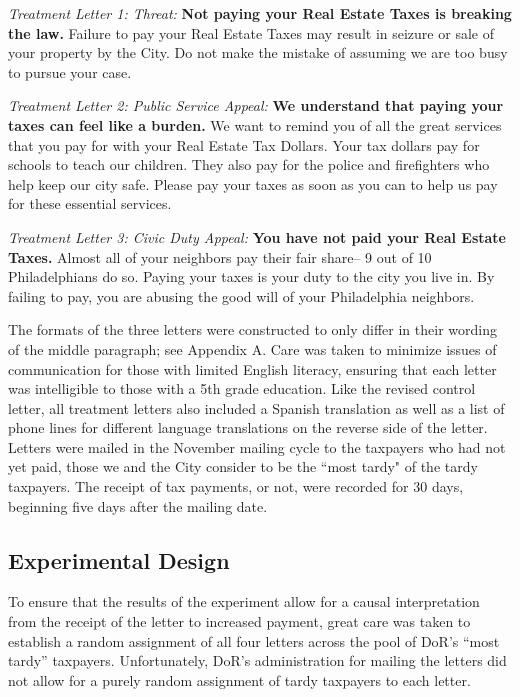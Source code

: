 \documentclass[12pt,titlepage]{article}
\begin{document}
{\it Treatment Letter 1: Threat: } {\bf Not paying your Real Estate
  Taxes is breaking the law.} Failure to pay your Real Estate Taxes
may result in seizure or sale of your property by the City. Do not
make the mistake of assuming we are too busy to pursue your case.

{\it Treatment Letter 2: Public Service Appeal: } {\bf We understand that
  paying your taxes can feel like a burden.} We want to remind you of
all the great services that you pay for with your Real Estate Tax
Dollars. Your tax dollars pay for schools to teach our children.  They
also pay for the police and firefighters who help keep our city safe.
Please pay your taxes as soon as you can to help us pay for these
essential services.
  
{ \it Treatment Letter 3: Civic Duty Appeal: } {\bf You have not paid your
  Real Estate Taxes.}  Almost all of your neighbors pay their fair
share-- 9 out of 10 Philadelphians do so. Paying your taxes is your
duty to the city you live in. By failing to pay, you are abusing the
good will of your Philadelphia neighbors.

The formats of the three letters were constructed to only differ in
their wording of the middle paragraph; see Appendix A.  Care was taken
to minimize issues of communication for those with limited English
literacy, ensuring that each letter was intelligible to those with a
5th grade education.  Like the revised control letter, all treatment
letters also included a Spanish translation as well as a list of phone
lines for different language translations on the reverse side of the
letter.  Letters were mailed in the November mailing cycle to the
taxpayers who had not yet paid, those we and the City consider to be
the ``most tardy" of the tardy taxpayers.  The receipt of tax payments,
or not, were recorded for 30 days, beginning five days after the
mailing date.


\subsection{Experimental Design}

To ensure that the results of the experiment allow for a causal
interpretation from the receipt of the letter to increased payment,
great care was taken to establish a random assignment of all four
letters across the pool of DoR's ``most tardy'' taxpayers.
Unfortunately, DoR's administration for mailing the letters did not
allow for a purely random assignment of tardy taxpayers to each
letter.
\end{document}

